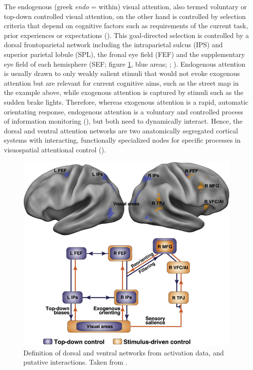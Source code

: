 \documentclass[a4paper, 12pt]{scrreprt}
\begin{document}
The endogenous (greek \textit{endo} = within) visual attention, also termed voluntary or top-down controlled visual attention, on the other hand is controlled by selection criteria that depend on cognitive factors such as requirements of the current task, prior experiences or expectations (\cite{itti2001computational}). This goal-directed selection is controlled by a dorsal frontoparietal network including the intraparietal sulcus (IPS) and superior parietal lobule (SPL), the fronal eye field (FEF) and the supplementary eye field of each hemisphere (SEF; figure \ref{fig:Networks}, blue areas; \cite{corbetta2002control}; \cite{corbetta2008reorienting}). Endogenous attention is usually drawn to only weakly salient stimuli that would not evoke exogenous attention but are relevant for current cognitive aims, such as the street map in the example above, while exogenous attention is captured by stimuli such as the sudden brake lights. Therefore, whereas exogenous attention is a rapid, automatic orientating response, endogenous attention is a voluntary and controlled process of information monitoring (\cite{carrasco2011visual}), but both need to dynamically interact. Hence, the dorsal and ventral attention networks are two anatomically segregated cortical systems with interacting, functionally specialized nodes for specific processes in visuospatial attentional control (\cite{vossel2014dorsal}).

\begin{figure}[H]
	\includegraphics[scale=0.4]{img/attentionnetworks.png}
	\caption[Dorsal and ventral attention networks]
	{\small{Definition of dorsal and ventral networks from activation data, and putative interactions. Taken from \textcite{corbetta2008reorienting}.}}
	\label{fig:Networks}
\end{figure}
\end{document}
